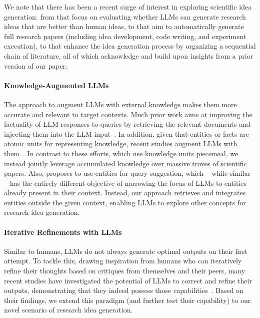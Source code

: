 \documentclass[11pt]{article}
\begin{document}
We note that there has been a recent surge of interest in exploring scientific idea generation: from \citet{li2024chainideasrevolutionizingresearch} that focus on evaluating whether LLMs can generate research ideas that are better than human ideas, to \citet{lu2024aiscientistfullyautomated} that aim to automatically generate full research papers (including idea development, code writing, and experiment execution), to \citet{li2024chainideasrevolutionizingresearch} that enhance the idea generation process by organizing a sequential chain of literature, all of which acknowledge and build upon insights from a prior version of our paper.

\paragraph{Knowledge-Augmented LLMs}
The approach to augment LLMs with external knowledge makes them more accurate and relevant to target contexts. Much prior work aims at improving the factuality of LLM responses to queries by retrieving the relevant documents and injecting them into the LLM input~\cite{InternetaugmentedLM, InContextRetrieval, REPLUG}. In addition, given that entities or facts are atomic units for representing knowledge, recent studies augment LLMs with them~\cite{KAPING, RetrieveRewriteAnswer}. In contrast to these efforts, which use knowledge units piecemeal, we instead jointly leverage accumulated knowledge over massive troves of scientific papers. Also, \citet{K-LaMP} proposes to use entities for query suggestion, which -- while similar -- has the entirely different objective of narrowing the focus of LLMs to entities already present in their context. Instead, our approach retrieves and integrates entities outside the given context, enabling LLMs to explore other concepts for research idea generation.

\paragraph{Iterative Refinements with LLMs}
Similar to humans, LLMs do not always generate optimal outputs on their first attempt. To tackle this, drawing inspiration from humans who can iteratively refine their thoughts based on critiques from themselves and their peers, many recent studies have investigated the potential of LLMs to correct and refine their outputs, demonstrating that they indeed possess those capabilities~\cite{self-refine/0, self-refine/1, self-refine/2, self-refine/3, CLBD, zeroshot/hypothesis, tomato}. Based on their findings, we extend this paradigm (and further test their capability) to our novel scenario of research idea generation.
\end{document}
